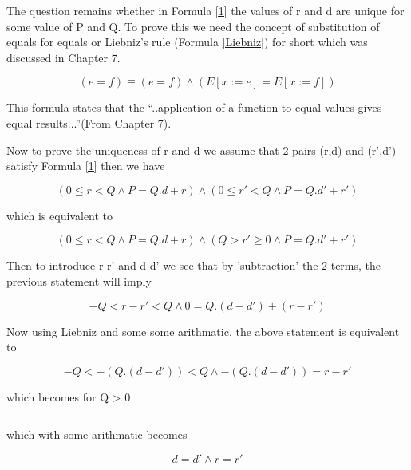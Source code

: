 \documentclass[10pt,a4paper]{article}
\begin{document}
The question remains whether in Formula \ref{1} the values of r and d are unique for some value of P and Q. To prove this we need the concept of substitution of equals for equals or Liebniz's rule (Formula \ref{Liebniz}) for short which was discussed in Chapter 7.

\begin{equation}
\label{Liebniz}
 (e=f)\equiv (e=f)\wedge (E[x:=e]=E[x:=f])
\end{equation}

This formula states that the ``..application of a function to equal values gives equal results...''(From Chapter 7).

Now to prove the uniqueness of r and d we assume that 2 pairs (r,d) and (r',d') satisfy Formula \ref{1} then we have

\begin{equation}
 (0\le r < Q \wedge P=Q.d+r)\wedge (0\le r' < Q \wedge P=Q.d'+r')
\end{equation}

which is equivalent to 

\begin{equation}
 (0\le r < Q \wedge P=Q.d+r)\wedge (Q > r' \ge 0 \wedge P=Q.d'+r')
\end{equation}

Then to introduce r-r'  and d-d' we see that by 'subtraction' the 2 terms, the previous statement will imply

\begin{equation}
 -Q<r-r'<Q \wedge 0 = Q.(d-d')+(r-r')
\end{equation}

Now using Liebniz and some some arithmatic, the above statement is equivalent to 

\begin{equation}
 -Q<-(Q.(d-d'))<Q \wedge -(Q.(d-d')) = r-r'
\end{equation}

which becomes for Q > 0

\begin{equation}
\end{equation}

which with some arithmatic becomes

\begin{equation}
 d=d' \wedge r=r'
\end{equation}
\end{document}
